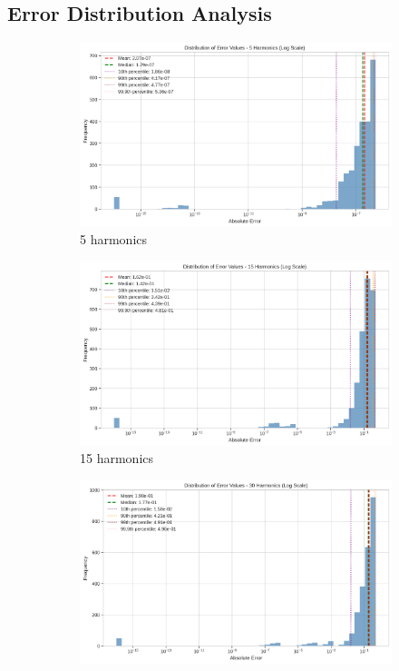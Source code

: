\subsection{Error Distribution Analysis}

\begin{figure}[H]
    \centering
    \begin{subfigure}[b]{0.32\textwidth}
        \centering
        \includegraphics[width=\textwidth]{figures/error_distribution_5h.png}
        \caption{5 harmonics}
    \end{subfigure}
    \hfill
    \begin{subfigure}[b]{0.32\textwidth}
        \centering
        \includegraphics[width=\textwidth]{figures/error_distribution_15h.png}
        \caption{15 harmonics}
    \end{subfigure}
    \hfill
    \begin{subfigure}[b]{0.32\textwidth}
        \centering
        \includegraphics[width=\textwidth]{figures/error_distribution_30h.png}

\end{subfigure}
\end{figure}
